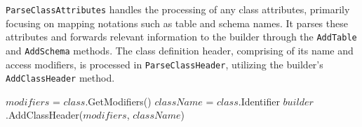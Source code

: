 \texttt{ParseClassAttributes} handles the processing of any class attributes, primarily focusing on mapping notations such as table and schema names. It parses these attributes and forwards relevant information to the builder through the \texttt{AddTable} and \texttt{AddSchema} methods. The class definition header, comprising of its name and access modifiers, is processed in \texttt{ParseClassHeader}, utilizing the builder's \texttt{AddClassHeader} method.

\begin{algorithm}[!htp]
    \small
    \DontPrintSemicolon
    
    
    \BlankLine
\caption{Entity mapping parser - function \texttt{ParseClassAttributes}}
\label{alg:parser_class_attr}
\end{algorithm}


\begin{algorithm}[!htp]
    \small
    \DontPrintSemicolon
    
    
    $modifiers$ = $class$.GetModifiers()\;
    $className$ = $class$.Identifier\;
    $builder$.AddClassHeader($modifiers$, $className$)\;
    
    \caption{Entity mapping parser - function \texttt{ParseClassHeader}}
    \label{alg:parser_class_header}
\end{algorithm}

